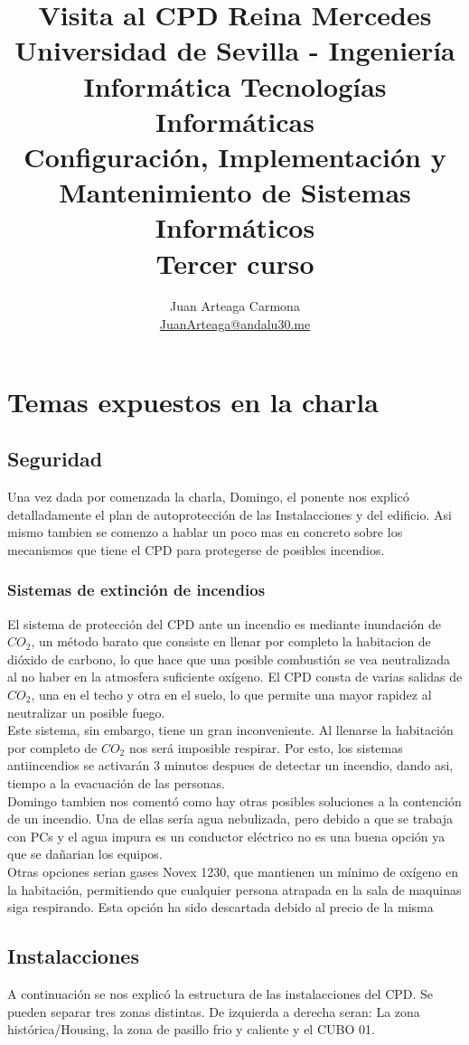 \documentclass[a4paper,11pt]{article}
\title{
        \textbf{Visita al CPD Reina Mercedes}\large\\
        \medskip
        Universidad de Sevilla - Ingeniería Informática Tecnologías Informáticas\\
        Configuración, Implementación y Mantenimiento de Sistemas Informáticos\\
        Tercer curso}
\author{
Juan Arteaga Carmona\\
\href{mailto:JuanArteaga@andalu30.me}{JuanArteaga@andalu30.me}
}
\begin{document}
\maketitle %
\newpage %
\tableofcontents
\newpage


\section{Temas expuestos en la charla}
\subsection{Seguridad}
Una vez dada por comenzada la charla, Domingo, el ponente nos explicó detalladamente el plan de autoprotección de las Instalacciones y del edificio. Asi mismo tambien se comenzo a hablar un poco mas en concreto sobre los mecanismos que tiene el CPD para protegerse de posibles incendios.
\subsubsection{Sistemas de extinción de incendios}
El sistema de protección del CPD ante un incendio es mediante inundación de $CO_2$, un método barato que consiste en llenar por completo la habitacion de dióxido de carbono, lo que hace que una posible combustión se vea neutralizada al no haber en la atmosfera suficiente oxígeno. El CPD consta de varias salidas de $CO_2$, una en el techo y otra en el suelo, lo que permite una mayor rapidez al neutralizar un posible fuego.\\
Este sistema, sin embargo, tiene un gran inconveniente. Al llenarse la habitación por completo de $CO_2$ nos será imposible respirar. Por esto, los sistemas antiincendios se activarán 3 minutos despues de detectar un incendio, dando asi, tiempo a la evacuación de las personas.\\
Domingo tambien nos comentó como hay otras posibles soluciones a la contención de un incendio. Una de ellas sería agua nebulizada, pero debido a que se trabaja con PCs y el agua impura es un conductor eléctrico no es una buena opción ya que se dañarian los equipos.\\
Otras opciones serian gases Novex 1230, que mantienen un mínimo de oxígeno en la habitación, permitiendo que cualquier persona atrapada en la sala de maquinas siga respirando. Esta opción ha sido descartada debido al precio de la misma\\


\subsection{Instalacciones}
A continuación se nos explicó la estructura de las instalacciones del CPD. Se pueden separar tres zonas distintas. De izquierda a derecha seran:  La zona histórica/Housing, la zona de pasillo frio y caliente y el CUBO 01.
\end{document}
